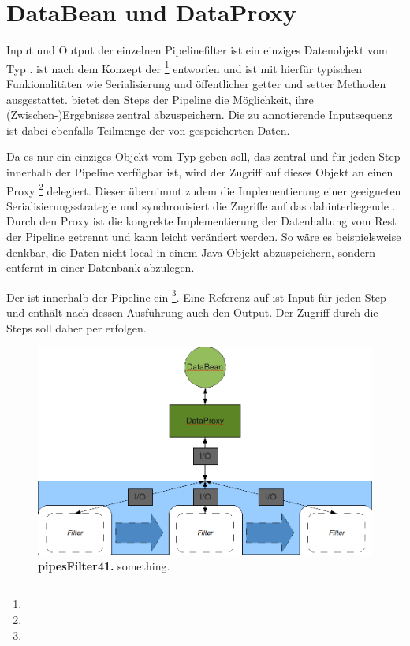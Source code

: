 \section{DataBean und DataProxy}
Input und Output der einzelnen Pipelinefilter ist ein einziges
Datenobjekt vom Typ .
 ist nach dem Konzept der 
\footnote{}
entworfen und ist mit hierfür typischen Funkionalitäten wie Serialisierung und
öffentlicher getter und setter Methoden ausgestattet.
 bietet den Steps der Pipeline die Möglichkeit, ihre
(Zwischen-)Ergebnisse zentral abzuspeichern.
Die zu annotierende Inputsequenz  ist dabei ebenfalls Teilmenge der
von  gespeicherten Daten.

Da es nur ein einziges Objekt vom Typ  geben soll, das zentral
und für jeden Step innerhalb der Pipeline verfügbar ist, wird der Zugriff auf
dieses Objekt an einen Proxy
\footnote{}
delegiert.
Dieser übernimmt zudem die Implementierung einer geeigneten
Serialisierungsstrategie und synchronisiert die Zugriffe auf das
dahinterliegende  .
Durch den Proxy ist die kongrekte Implementierung der Datenhaltung
 vom Rest der Pipeline getrennt und kann leicht verändert
werden.
So wäre es beispielsweise denkbar, die Daten nicht local in einem Java Objekt
abzuspeichern, sondern entfernt in einer Datenbank abzulegen. 

Der  ist innerhalb der Pipeline ein 
\footnote{}.
Eine Referenz auf  ist Input für jeden Step und enthält nach
dessen Ausführung auch den Output.
Der Zugriff durch die Steps soll daher per  erfolgen.

\begin{figure}[htbp]
	\begin{center}
		\includegraphics[scale=0.55]{pics/pipesFilter41.png}
	\caption[pipesFilter41]{
	\textbf{pipesFilter41.}
	something.}
	\end{center}
	\label{fig:pipesFilter41}
\end{figure}

